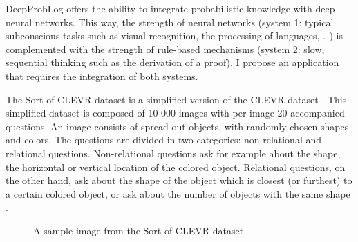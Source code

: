 \documentclass{setup}
\begin{document}
	\maketitle

	DeepProbLog offers the ability to integrate probabilistic knowledge with deep neural networks. This way, the strength of neural networks (system 1: typical subconscious tasks such as visual recognition, the processing of languages, \dots) is complemented with the strength of rule-based mechanisms (system 2: slow, sequential thinking such as the derivation of a proof). I propose an application that requires the integration of both systems.

	The Sort-of-CLEVR dataset is a simplified version of the CLEVR dataset \cite{clevr_dataset}. This simplified dataset is composed of 10 000 images with per image 20 accompanied questions. An image consists of spread out objects, with randomly chosen shapes and colors. The questions are divided in two categories: non-relational and relational questions. Non-relational questions ask for example about the shape, the horizontal or vertical location of the colored object. Relational questions, on the other hand, ask about the shape of the object which is closest (or furthest) to a certain colored object, or ask about the number of objects with the same shape \cite{sort_of_clevr_dataset}.

	\begin{figure}[htbp]
		\centerline{}
		\caption{A sample image from the Sort-of-CLEVR dataset \cite{sort_of_clevr_dataset}}
		\label{image:example_image_of_dataset}
		\end{figure}
\end{document}
